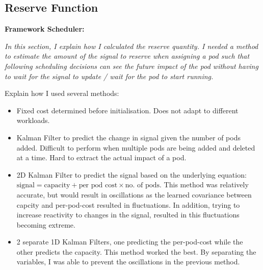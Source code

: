 \subsection{Reserve Function}
\begin{tcolorbox}[boxsep=0mm,left=2.5mm,right=2.5mm]
    \textbf{Framework Scheduler:} {\em In this section, I explain how I
    calculated the reserve quantity. I needed a method to estimate the amount of
    the signal to reserve when assigning a pod such that following scheduling
    decisions can see the future impact of the pod without having to wait for
    the signal to update / wait for the pod to start running.

    Explain how I used several methods:
    \begin{itemize}
        \item Fixed cost determined before initialisation. Does not adapt to
            different workloads.
        \item Kalman Filter to predict the change in signal given the number of
            pods added. Difficult to perform when multiple pods are being added
            and deleted at a time. Hard to extract the actual impact of a pod.
        \item 2D Kalman Filter to predict the signal based on the underlying
            equation: $\text{signal} = \text{capacity} + \text{per pod cost} \times \text{no. of pods}$.
            This method was relatively accurate, but
            would result in oscillations as the learned covariance between
            capcity and per-pod-cost resulted in fluctuations. In addition,
            trying to increase reactivity to changes in the signal, resulted in
            this fluctuations becoming extreme.
        \item 2 separate 1D Kalman Filters, one predicting the per-pod-cost
            while the other predicts the capacity. This method worked the best.
            By separating the variables, I was able to prevent the oscillations
            in the previous method.
    \end{itemize}
    }
\end{tcolorbox}
